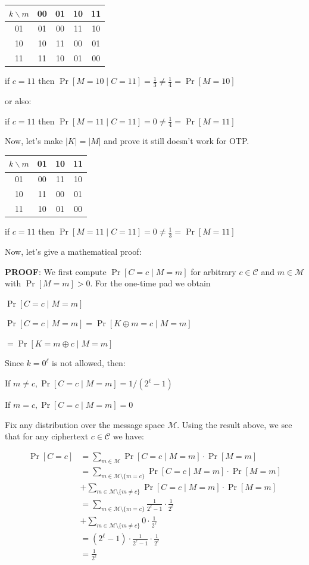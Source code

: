 	\begin{tabular}{c|cccc}
	$k \backslash m$ & 00 & 01 & 10 & 11 \\
	\hline
	01 & 01 & 00 & 11 & 10 \\
	10 & 10 & 11 & 00 & 01 \\
	11 & 11 & 10 & 01 & 00 \\
	\end{tabular}
	
	if $c = 11$ then $\Pr[M = 10 \mid C = 11] = \frac{1}{3} \ne \frac{1}{4} = \Pr[M = 10]$
	
	or also:
	
	if $c = 11$ then $\Pr[M = 11 \mid C = 11] = 0 \ne \frac{1}{4} = \Pr[M = 11]$
	
	Now, let's make $|K| = |M|$ and prove it still doesn't work for OTP.
	
	\begin{tabular}{c|ccc}
		$k \backslash m$ & 01 & 10 & 11 \\
		\hline
		01 & 00 & 11 & 10 \\
		10 & 11 & 00 & 01 \\
		11 & 10 & 01 & 00 \\
	\end{tabular}
	
	if $c = 11$ then $\Pr[M = 11 \mid C = 11] = 0 \ne \frac{1}{3} = \Pr[M = 11]$
	
	Now, let's give a mathematical proof:
	
	\textbf{PROOF}: We first compute $\Pr[C=c \mid M=m]$ for arbitrary $c\in\mathcal{C}$ and $m\in\mathcal{M}$ with $\Pr[M=m]>0$.  For the one-time pad we obtain
	

	$\Pr[C=c \mid M=m]$
	
	$\Pr[C = c \mid M = m] = \Pr[K \oplus m = c \mid M= m]$

	$= \Pr[K = m \oplus c \mid M = m]$
	
	Since $k = 0^\ell$ is not allowed, then: 
	
	If $m \ne c, \Pr[C=c \mid M=m] = 1 / (2^\ell -1 )$

    If $m = c, \Pr[C=c \mid M=m] = 0$
	
	Fix any distribution over the message space $\mathcal{M}$. Using the result above, we see that for any ciphertext $c \in \mathcal{C}$ we have:
	
	\[
	\begin{aligned}
		\Pr[C = c] 
		&= \sum_{m \in \mathcal{M}} \Pr[C = c \mid M = m] \cdot \Pr[M = m] \\
		&= \sum_{m \in \mathcal{M} \setminus \{m = c\} } \Pr[C = c \mid M = m] \cdot \Pr[M = m] \\
        &+ \sum_{m \in \mathcal{M} \setminus \{m \ne c\} } \Pr[C = c \mid M = m] \cdot \Pr[M = m] \\
        &= \sum_{m \in \mathcal{M} \setminus \{m = c\} } \frac{1}{2^\ell -1} \cdot \frac{1}{2^\ell} \\
        &+ \sum_{m \in \mathcal{M} \setminus \{m \ne c\} } 0 \cdot \frac{1}{2^\ell} \\
		&=  (2^\ell - 1) \cdot \frac{1}{2^\ell -1} \cdot \frac{1}{2^\ell} \\
	    &=  \frac{1}{2^\ell} \\
	\end{aligned}
	\]
	
